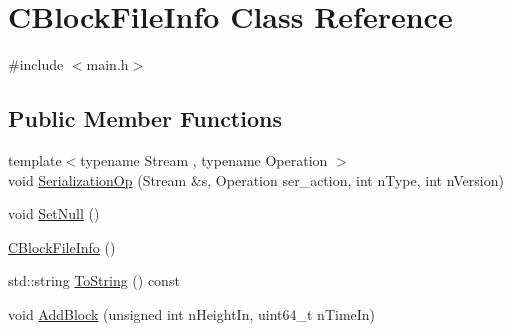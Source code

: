 \hypertarget{class_c_block_file_info}{}\section{C\+Block\+File\+Info Class Reference}
\label{class_c_block_file_info}


{\ttfamily \#include $<$main.\+h$>$}

\subsection*{Public Member Functions}
\begin{DoxyCompactItemize}
\item 
{\footnotesize template$<$typename Stream , typename Operation $>$ }\\void \hyperlink{class_c_block_file_info_a5d48a4fe1f8b3903131d121fc14a5a6f}{Serialization\+Op} (Stream \&s, Operation ser\+\_\+action, int n\+Type, int n\+Version)
\item 
void \hyperlink{class_c_block_file_info_a21bd4f8e92c47646737fc57446a86cc2}{Set\+Null} ()
\item 
\hyperlink{class_c_block_file_info_a4d08bfcfc45a16b40266255f8597c949}{C\+Block\+File\+Info} ()
\item 
std\+::string \hyperlink{class_c_block_file_info_a90d40a769ca47c075757c1b9037c88f3}{To\+String} () const 
\item 
void \hyperlink{class_c_block_file_info_a66867569ffe06068b8c6eb1139934fbf}{Add\+Block} (unsigned int n\+Height\+In, uint64\+\_\+t n\+Time\+In)
\end{DoxyCompactItemize}
